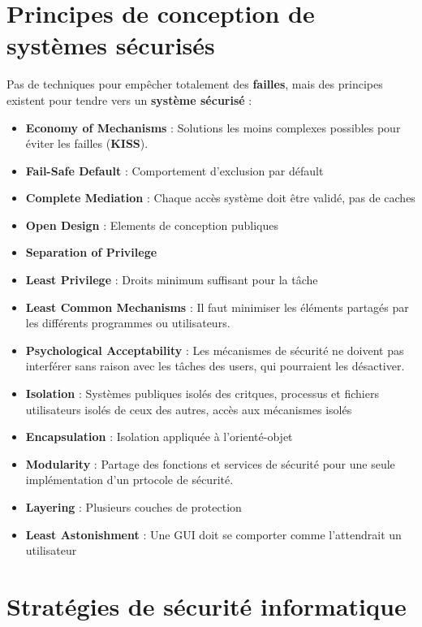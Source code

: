 \documentclass{report}
\begin{document}
	\section{Principes de conception de systèmes sécurisés}

		Pas de techniques pour empêcher totalement des \textbf{failles}, mais des principes existent pour tendre vers un \textbf{système sécurisé} : \\

		\begin{itemize}
		 	\item \textbf{Economy of Mechanisms} : Solutions les moins complexes possibles pour éviter les failles (\textbf{KISS}).\\
		 	\item \textbf{Fail-Safe Default} : Comportement d'exclusion par défault
		 	\item \textbf{Complete Mediation} : Chaque accès système doit être validé, pas de caches
		 	\item \textbf{Open Design} : Elements de conception publiques
		 	\item \textbf{Separation of Privilege}
		 	\item \textbf{Least Privilege} : Droits minimum suffisant pour la tâche
		 	\item \textbf{Least Common Mechanisms} : Il faut minimiser les éléments partagés par les différents programmes ou utilisateurs.
		 	\item \textbf{Psychological Acceptability} : Les mécanismes de sécurité ne doivent pas interférer sans raison avec les tâches des users, qui pourraient les désactiver.
		 	\item \textbf{Isolation} : Systèmes publiques isolés des critques, processus et fichiers utilisateurs isolés de ceux des autres, accès aux mécanismes isolés
		 	\item \textbf{Encapsulation} : Isolation appliquée à l'orienté-objet
		 	\item \textbf{Modularity} : Partage des fonctions et services de sécurité pour une seule implémentation d'un prtocole de sécurité.
		 	\item \textbf{Layering} : Plusieurs couches de protection
		 	\item \textbf{Least Astonishment} : Une GUI doit se comporter comme l'attendrait un utilisateur\\
		 \end{itemize} 

	\section{Stratégies de sécurité informatique}
\end{document}

